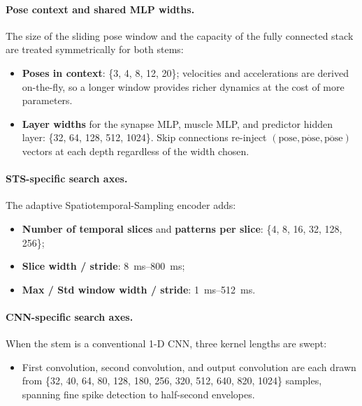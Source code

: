 \paragraph{Pose context and shared MLP widths.}
The size of the sliding pose window and the capacity of the fully connected
stack are treated symmetrically for both stems:

\begin{itemize}
  \item \textbf{Poses in context}: \{3, 4, 8, 12, 20\};
        velocities and accelerations are derived on-the-fly, so a longer
        window provides richer dynamics at the cost of more parameters.
  \item \textbf{Layer widths} for the synapse MLP, muscle MLP, and predictor
        hidden layer: \{32, 64, 128, 512, 1024\}.
        Skip connections re-inject \((\text{pose},\dot{\text{pose}},
        \ddot{\text{pose}})\) vectors at each depth regardless of the width
        chosen.
\end{itemize}

\paragraph{STS-specific search axes.}
The adaptive Spatiotemporal-Sampling encoder adds:

\begin{itemize}
  \item \textbf{Number of temporal slices} and \textbf{patterns per slice}:
        \{4, 8, 16, 32, 128, 256\};
  \item \textbf{Slice width / stride}: \SIrange{8}{800}{ms};
  \item \textbf{Max / Std window width / stride}:
        \SIrange{1}{512}{ms}.
\end{itemize}

\paragraph{CNN-specific search axes.}
When the stem is a conventional 1-D CNN, three kernel lengths are swept:

\begin{itemize}
  \item First convolution, second convolution, and output convolution are each
        drawn from
        \{32, 40, 64, 80, 128, 180, 256, 320, 512, 640, 820, 1024\} samples,
        spanning fine spike detection to half-second envelopes.
\end{itemize}


